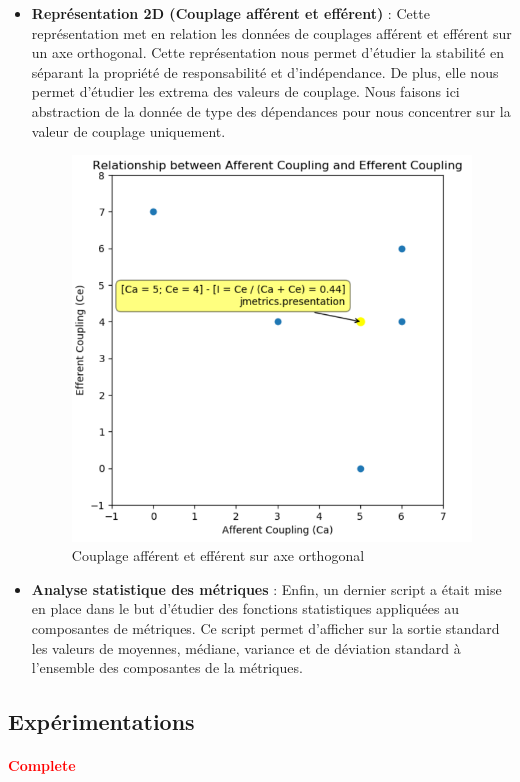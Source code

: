 \documentclass{scrartcl}
\newcommand{\TODO}[1] {
    \noindent \paragraph{\textcolor{red}{#1}}
}
\begin{document}
\begin{itemize}
        \item \textbf{Représentation 2D (Couplage afférent et efférent)} : Cette représentation met en relation les données de couplages afférent et efférent sur un axe orthogonal. Cette représentation nous permet d'étudier la stabilité en séparant la propriété de responsabilité et d'indépendance. De plus, elle nous permet d'étudier les extrema des valeurs de couplage. Nous faisons ici abstraction de la donnée de type des dépendances pour nous concentrer sur la valeur de couplage uniquement.
        \begin{figure}[h!]
            \centering
            \includegraphics[scale=0.59]{img/plot/coupling2daxis.png}
            \caption{Couplage afférent et efférent sur axe orthogonal}
        \end{figure}
        
        \item \textbf{Analyse statistique des métriques} : Enfin, un dernier script a était mise en place dans le but d'étudier des fonctions statistiques appliquées au composantes de métriques. Ce script permet d'afficher sur la sortie standard les valeurs de moyennes, médiane, variance et de déviation standard à l'ensemble des composantes de la métriques.
    \end{itemize}


\newpage
\subsection{Expérimentations}
    \TODO{Complete}
\end{document}
